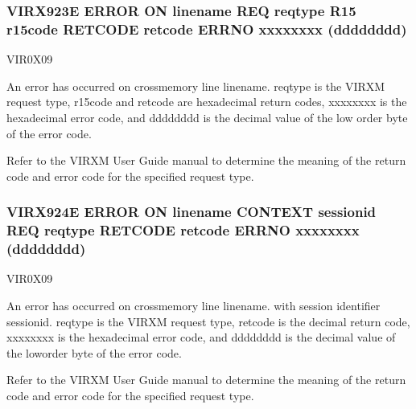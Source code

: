 \documentclass[letterpaper,10pt,english]{sphinxmanual}
\begin{document}
\subsubsection{VIRX923E ERROR ON linename REQ reqtype R15 r15code RETCODE retcode ERRNO xxxxxxxx (dddddddd)}
\label{\detokenize{messages:virx923e-error-on-linename-req-reqtype-r15-r15code-retcode-retcode-errno-xxxxxxxx-dddddddd}}\begin{description}
\sphinxAtStartPar
VIR0X09

\sphinxAtStartPar
An error has occurred on cross\sphinxhyphen{}memory line linename. reqtype is the VIRXM request type, r15code and retcode are hexadecimal return codes, xxxxxxxx is the hexadecimal error code, and dddddddd is the decimal value of the low\sphinxhyphen{} order byte of the error code.

\sphinxAtStartPar
Refer to the VIRXM User Guide manual to determine the meaning of the return code and error code for the specified request type.

\end{description}


\subsubsection{VIRX924E ERROR ON linename CONTEXT sessionid REQ reqtype RETCODE retcode ERRNO xxxxxxxx (dddddddd)}
\label{\detokenize{messages:virx924e-error-on-linename-context-sessionid-req-reqtype-retcode-retcode-errno-xxxxxxxx-dddddddd}}\begin{description}
\sphinxAtStartPar
VIR0X09

\sphinxAtStartPar
An error has occurred on cross\sphinxhyphen{}memory line linename. with session identifier sessionid. reqtype is the VIRXM request type, retcode is the decimal return code, xxxxxxxx is the hexadecimal error code, and dddddddd is the decimal value of the low\sphinxhyphen{}order byte of the error code.

\sphinxAtStartPar
Refer to the VIRXM User Guide manual to determine the meaning of the return code and error code for the specified request type.

\end{description}
\end{document}

